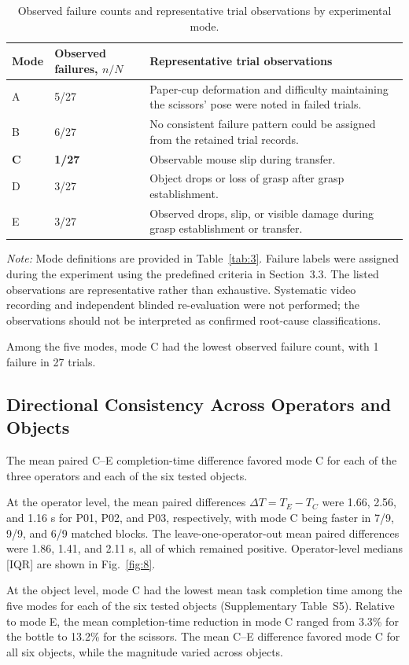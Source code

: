 \begin{table}[!t]
\centering
\caption{Observed failure counts and representative trial observations by experimental mode.}
\label{tab:10}
\small
\setlength{\tabcolsep}{6pt}
\renewcommand{\arraystretch}{1.16}
\begin{tabularx}{\textwidth}{@{}p{}p{}Y@{}}
\toprule
Mode & Observed failures, $n/N$ & Representative trial observations \\
\midrule
A & 5/27 & Paper-cup deformation and difficulty maintaining the scissors' pose were noted in failed trials. \\
B & 6/27 & No consistent failure pattern could be assigned from the retained trial records. \\
\textbf{C} & \textbf{1/27} & Observable mouse slip during transfer. \\
D & 3/27 & Object drops or loss of grasp after grasp establishment. \\
E & 3/27 & Observed drops, slip, or visible damage during grasp establishment or transfer. \\
\bottomrule
\end{tabularx}
\par\smallskip
\footnotesize\textit{Note:} Mode definitions are provided in Table~\ref{tab:3}. Failure labels were assigned during the experiment using the predefined criteria in Section~3.3. The listed observations are representative rather than exhaustive. Systematic video recording and independent blinded re-evaluation were not performed; the observations should not be interpreted as confirmed root-cause classifications.
\end{table}
Among the five modes, mode C had the lowest observed failure count, with 1 failure in 27 trials.

\subsection{Directional Consistency Across Operators and Objects}
The mean paired C--E completion-time difference favored mode C for each of the three operators and each of the six tested objects.

At the operator level, the mean paired differences $\Delta T=T_E-T_C$ were 1.66, 2.56, and 1.16 s for P01, P02, and P03, respectively, with mode C being faster in 7/9, 9/9, and 6/9 matched blocks. The leave-one-operator-out mean paired differences were 1.86, 1.41, and 2.11 s, all of which remained positive. Operator-level medians [IQR] are shown in Fig.~\ref{fig:8}.

At the object level, mode C had the lowest mean task completion time among the five modes for each of the six tested objects (Supplementary Table~S5). Relative to mode E, the mean completion-time reduction in mode C ranged from 3.3\% for the bottle to 13.2\% for the scissors. The mean C--E difference favored mode C for all six objects, while the magnitude varied across objects.
